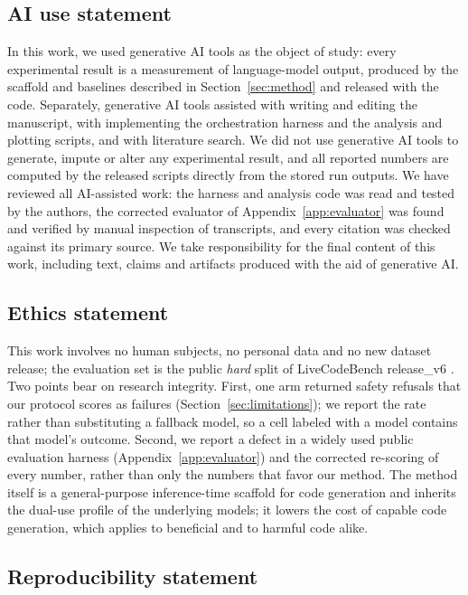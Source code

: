 \documentclass{article}
\begin{document}
\subsection*{AI use statement}

In this work, we used generative AI tools as the object of study: every experimental result is a
measurement of language-model output, produced by the scaffold and baselines described in
Section~\ref{sec:method} and released with the code. Separately, generative AI tools assisted
with writing and editing the manuscript, with implementing the orchestration harness and the
analysis and plotting scripts, and with literature search. We did not use generative AI tools to
generate, impute or alter any experimental result, and all reported numbers are computed by the
released scripts directly from the stored run outputs. We have reviewed all AI-assisted work: the
harness and analysis code was read and tested by the authors, the corrected evaluator of
Appendix~\ref{app:evaluator} was found and verified by manual inspection of transcripts, and every
citation was checked against its primary source. We take responsibility for the final content of
this work, including text, claims and artifacts produced with the aid of generative AI.

\subsection*{Ethics statement}

This work involves no human subjects, no personal data and no new dataset release; the evaluation
set is the public \emph{hard} split of LiveCodeBench release\_v6 \citep{jain2024}. Two points bear
on research integrity. First, one arm returned safety refusals that our protocol scores as
failures (Section~\ref{sec:limitations}); we report the rate rather than substituting a fallback
model, so a cell labeled with a model contains that model's outcome. Second, we report a defect in
a widely used public evaluation harness (Appendix~\ref{app:evaluator}) and the corrected
re-scoring of every number, rather than only the numbers that favor our method. The method itself
is a general-purpose inference-time scaffold for code generation and inherits the dual-use profile
of the underlying models; it lowers the cost of capable code generation, which applies to
beneficial and to harmful code alike.

\subsection*{Reproducibility statement}
\end{document}
